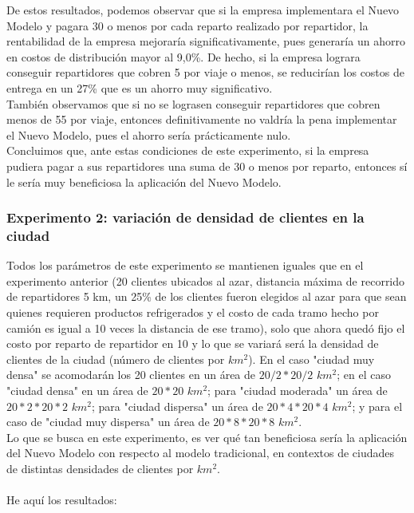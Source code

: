 \documentclass{article}
\begin{document}
    De estos resultados, podemos observar que si la empresa implementara el Nuevo Modelo y pagara 30 o menos por cada reparto realizado por repartidor, la rentabilidad de la empresa mejoraría significativamente, pues generaría un ahorro en costos de distribución mayor al 9,0\%. De hecho, si la empresa lograra conseguir repartidores que cobren 5 por viaje o menos, se reducirían los costos de entrega en un 27\% que es un ahorro muy significativo. \\
    También observamos que si no se lograsen conseguir repartidores que cobren menos de 55 por viaje, entonces definitivamente no valdría la pena implementar el Nuevo Modelo, pues el ahorro sería prácticamente nulo. \\
    Concluimos que, ante estas condiciones de este experimento, si la empresa pudiera pagar a sus repartidores una suma de 30 o menos por reparto, entonces sí le sería muy beneficiosa la aplicación del Nuevo Modelo. 
    
    
    \subsubsection{Experimento 2: variación de densidad de clientes en la ciudad}
    
    Todos los parámetros de este experimento se mantienen iguales que en el experimento anterior (20 clientes ubicados al azar, distancia máxima de recorrido de repartidores 5 km, un 25\% de los clientes fueron elegidos al azar para que sean quienes requieren productos refrigerados y el costo de cada tramo hecho por camión es igual a 10 veces la distancia de ese tramo), solo que ahora quedó fijo el costo por reparto de repartidor en 10 y lo que se variará será la densidad de clientes de la ciudad (número de clientes por $km^{2}$). En el caso "ciudad muy densa" se acomodarán los 20 clientes en un área de  $20/2 * 20/2$ $km^{2}$; en el caso "ciudad densa" en un área de $20 * 20$ $km^{2}$; para "ciudad moderada" un área de $20*2 * 20*2$ $km^{2}$; para "ciudad dispersa" un área de $20*4 * 20*4$ $km^{2}$; y para el caso de "ciudad muy dispersa" un área de $20*8 * 20*8$ $km^{2}$.  \\
    Lo que se busca en este experimento, es ver qué tan beneficiosa sería la aplicación del Nuevo Modelo con respecto al modelo tradicional, en contextos de ciudades de distintas densidades de clientes por $km^{2}$. \\
    \\
    He aquí los resultados:
    
\end{document}
